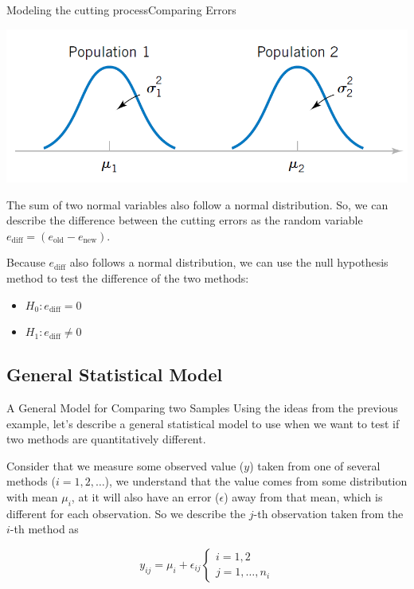 \begin{frame}[t]{Modeling the cutting process}{Comparing Errors}
    \begin{center}
      \includegraphics[width=.4\textwidth]{../img/two_population_model}
    \end{center}

    The sum of two normal variables also follow a normal distribution. So, we can describe the difference between the cutting errors as the random variable $e_{\text{diff}}  = (e_{\text{old}} - e_{\text{new}})$.\bigskip

    Because $e_{\text{diff}}$ also follows a normal distribution, we can use the null hypothesis method to test the difference of the two methods:
    \begin{itemize}
      \item $H_0: e_{\text{diff}} = 0$
      \item $H_1: e_{\text{diff}} \neq 0$
    \end{itemize}
\end{frame}

\subsection{General Statistical Model}
\begin{frame}{A General Model for Comparing two Samples}
  Using the ideas from the previous example, let's describe a general statistical model to use when we want to test if two methods are quantitatively different.\bigskip

  Consider that we measure some observed value ($y$) taken from one of several methods ($i = 1, 2,\ldots$), we understand that the value comes from some distribution with mean $\mu_i$, at it will also have an error ($\epsilon$) away from that mean, which is different for each observation. So we describe the $j$-th observation taken from the $i$-th method as

  \begin{equation*}
    y_{ij} = \mu_i + \epsilon_{ij}\begin{cases}i=1,2\\j=1,\ldots,n_i\end{cases}
  \end{equation*}
\end{frame}

